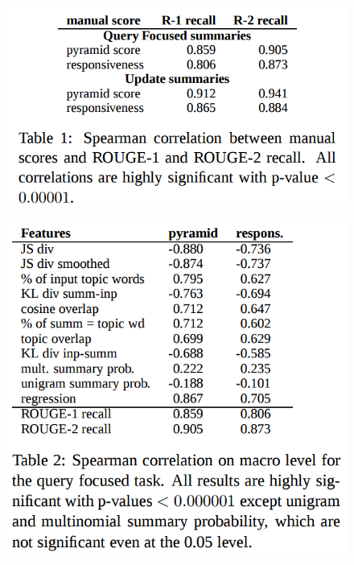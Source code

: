 \documentclass[xcolor={table}]{beamer}
\begin{document}
\begin{frame}[t]{\cite{louis2009automatically}}
      \begin{figure}[h]
          \centering
      \includegraphics[scale=.25]{images/table1-louis09.png} \\
  \end{figure}
\end{frame}
\begin{frame}[t]{\cite{louis2009automatically}}
      \begin{figure}[h]
          \centering
      \includegraphics[scale=.25]{images/table2-louis09.png} \\
  \end{figure}
\end{frame}
\end{document}
